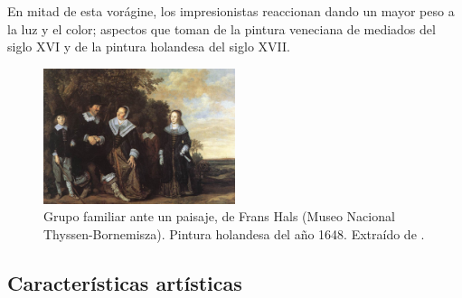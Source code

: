 \documentclass[../main.tex]{subfiles}
\begin{document}
En mitad de esta vorágine, los impresionistas reaccionan dando un mayor peso a la luz y el color; aspectos que toman de la pintura veneciana de mediados del siglo XVI y de la pintura holandesa del siglo XVII.

\begin{figure}[h!]
    \centering
    \includegraphics[width=0.5\textwidth]{imagenes/Grupo familiar ante un paisaje.jpg}
    \caption[Grupo familiar ante un paisaje, de Frans Hals]{Grupo familiar ante un paisaje, de Frans Hals (Museo Nacional Thyssen-Bornemisza). Pintura holandesa del año 1648. Extraído de \cite{Hals1648}.}
    \label{fig:hals_familia}
\end{figure}

\subsection{Características artísticas}
\end{document}
